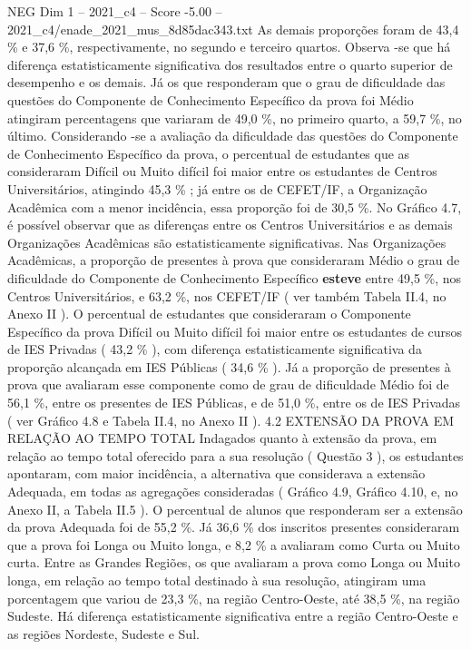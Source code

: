 \begin{textsample}{NEG Dim 1 – 2021\_c4 – Score -5.00 – 2021\_c4/enade\_2021\_mus\_8d85dac343.txt}
As demais proporções foram de 43,4 \% e 37,6 \%, respectivamente, no segundo e terceiro quartos.
Observa -se que há diferença estatisticamente significativa dos resultados entre o quarto superior de desempenho e os demais.
Já os que responderam que o grau de dificuldade das questões do Componente de Conhecimento Específico da prova foi Médio atingiram percentagens que variaram de 49,0 \%, no primeiro quarto, a 59,7 \%, no último.
Considerando -se a avaliação da dificuldade das questões do Componente de Conhecimento Específico da prova, o percentual de estudantes que as consideraram Difícil ou Muito difícil foi maior entre os estudantes de Centros Universitários, atingindo 45,3 \% ; já entre os de CEFET/IF, a Organização Acadêmica com a menor incidência, essa proporção foi de 30,5 \%.
No Gráfico 4.7, é possível observar que as diferenças entre os Centros Universitários e as demais Organizações Acadêmicas são estatisticamente significativas.
Nas Organizações Acadêmicas, a proporção de presentes à prova que consideraram Médio o grau de dificuldade do Componente de Conhecimento Específico \textbf{esteve} entre 49,5 \%, nos Centros Universitários, e 63,2 \%, nos CEFET/IF ( ver também Tabela II.4, no Anexo II ).
O percentual de estudantes que consideraram o Componente Específico da prova Difícil ou Muito difícil foi maior entre os estudantes de cursos de IES Privadas ( 43,2 \% ), com diferença estatisticamente significativa da proporção alcançada em IES Públicas ( 34,6 \% ).
Já a proporção de presentes à prova que avaliaram esse componente como de grau de dificuldade Médio foi de 56,1 \%, entre os presentes de IES Públicas, e de 51,0 \%, entre os de IES Privadas ( ver Gráfico 4.8 e Tabela II.4, no Anexo II ). 4.2 EXTENSÃO DA PROVA EM RELAÇÃO AO TEMPO TOTAL Indagados quanto à extensão da prova, em relação ao tempo total oferecido para a sua resolução ( Questão 3 ), os estudantes apontaram, com maior incidência, a alternativa que considerava a extensão Adequada, em todas as agregações consideradas ( Gráfico 4.9, Gráfico 4.10, e, no Anexo II, a Tabela II.5 ).
O percentual de alunos que responderam ser a extensão da prova Adequada foi de 55,2 \%.
Já 36,6 \% dos inscritos presentes consideraram que a prova foi Longa ou Muito longa, e 8,2 \% a avaliaram como Curta ou Muito curta.
Entre as Grandes Regiões, os que avaliaram a prova como Longa ou Muito longa, em relação ao tempo total destinado à sua resolução, atingiram uma porcentagem que variou de 23,3 \%, na região Centro-Oeste, até 38,5 \%, na região Sudeste.
Há diferença estatisticamente significativa entre a região Centro-Oeste e as regiões Nordeste, Sudeste e Sul.

\end{textsample}
